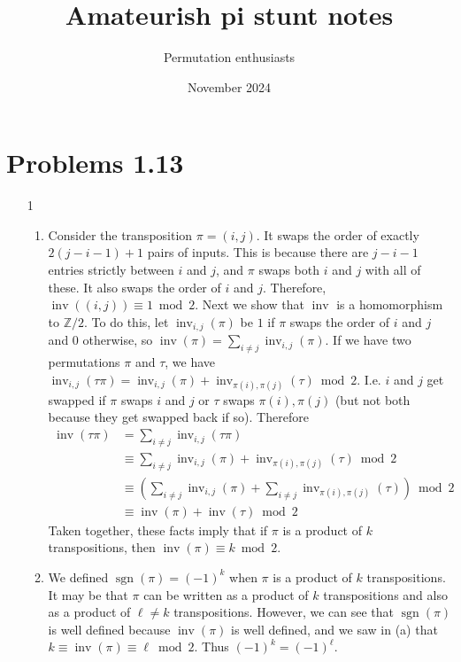 \documentclass{amsart}
\title{Amateurish pi stunt notes}
\author{Permutation enthusiasts}
\date{November 2024}
\DeclareMathOperator{\inv}{inv}
\DeclareMathOperator{\sgn}{sgn}
\newcommand{\ZZ}{\mathbb{Z}}
\begin{document}
\maketitle

\section{Problems 1.13}

\begin{enumerate}
    \item[1]
    \begin{enumerate}
        \item  Consider the transposition $\pi = (i,j)$.  It swaps the order of exactly $2(j-i-1) + 1$ pairs of inputs.  This is because there are $j-i-1$ entries strictly between $i$ and $j$, and $\pi$ swaps both $i$ and $j$ with all of these.  It also swaps the order of $i$ and $j$.  Therefore, $\inv((i,j)) \equiv 1 \bmod 2$.  Next we show that $\inv$ is a homomorphism to $\ZZ/2$.  To do this, let $\inv_{i,j}(\pi)$ be $1$ if $\pi$ swaps the order of $i$ and $j$ and $0$ otherwise, so $\inv(\pi) = \sum_{i \ne j}\inv_{i,j}(\pi)$.  If we have two permutations $\pi$ and $\tau$, we have $\inv_{i,j}(\tau\pi) = \inv_{i,j}(\pi) + \inv_{\pi(i),\pi(j)}(\tau) \bmod 2$. I.e. $i$ and $j$ get swapped if $\pi$ swaps $i$ and $j$ or $\tau$ swaps $\pi(i), \pi(j)$ (but not both because they get swapped back if so).
        Therefore
        \begin{align*}
        \inv(\tau\pi) &= \sum_{i\ne j} \inv_{i,j}(\tau\pi) \\
                      &\equiv \sum_{i\ne j} \inv_{i,j}(\pi) + \inv_{\pi(i),\pi(j)}(\tau) \bmod 2 \\
                      &\equiv \left(\sum_{i \ne j} \inv_{i,j}(\pi) + \sum_{i\ne j}\inv_{\pi(i),\pi(j)}(\tau)\right) \bmod 2  \\
                      &\equiv \inv(\pi) + \inv(\tau) \bmod 2
        \end{align*}
        Taken together, these facts imply that if $\pi$ is a product of $k$ transpositions, then $\inv(\pi) \equiv k \bmod 2$.
        \item We defined $\sgn(\pi) = (-1)^k$ when $\pi$ is a product of $k$ transpositions.  It may be that $\pi$ can be written as a product of $k$ transpositions and also as a product of $\ell\ne k$ transpositions.  However, we can see that $\sgn(\pi)$ is well defined because $\inv(\pi)$ is well defined, and we saw in (a) that $k \equiv \inv(\pi) \equiv \ell \bmod 2$.  Thus $(-1)^k = (-1)^\ell$.

\end{enumerate}
\end{enumerate}
\end{document}
